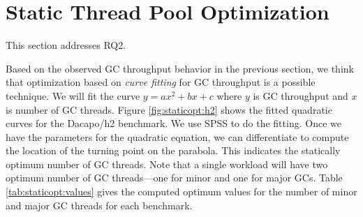 \section{Static Thread Pool Optimization}
\label{sec:staticopt}

This section addresses RQ2.

Based on the observed GC throughput behavior in the previous section,
we think that optimization based on \emph{curve fitting} for GC throughput 
is a possible technique.
We will fit the curve $y = ax^2 + bx + c$ where 
$y$ is GC throughput and 
$x$ is number of GC threads.
Figure \ref{fig:staticopt:h2} shows the fitted quadratic curves for 
the Dacapo/h2 benchmark. We use SPSS to do the fitting.
Once we have the parameters for the quadratic equation, we can 
differentiate to compute the location of the turning point on the parabola.
This indicates the statically optimum number of GC threads.
Note that a single workload will have two optimum number of GC threads---one for minor and one for major GCs.
Table \ref{tab:staticopt:values} gives the computed optimum values for the
number of minor and major GC threads for each benchmark.